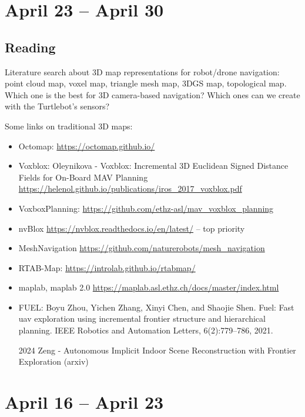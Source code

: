 \documentclass{article}
\begin{document}
\section{April 23 -- April 30}

\subsection{Reading}
Literature search about 3D map representations for robot/drone navigation: point cloud map, voxel map, triangle mesh map, 3DGS map, topological map. Which one is the best for 3D camera-based navigation? Which ones can we create with the Turtlebot's sensors?

Some links on traditional 3D maps:
\begin{itemize}
\item Octomap: \url{https://octomap.github.io/} 
\item Voxblox: Oleynikova - Voxblox: Incremental 3D Euclidean Signed Distance Fields for On-Board MAV Planning \url{https://helenol.github.io/publications/iros_2017_voxblox.pdf} 
\item VoxboxPlanning: \url{https://github.com/ethz-asl/mav_voxblox_planning} 
\item nvBlox \url{https://nvblox.readthedocs.io/en/latest/} -- top priority 
\item MeshNavigation \url{https://github.com/naturerobots/mesh_navigation} 
\item RTAB-Map: \url{https://introlab.github.io/rtabmap/} 
\item maplab, maplab 2.0 \url{https://maplab.asl.ethz.ch/docs/master/index.html} 
\item FUEL: Boyu Zhou, Yichen Zhang, Xinyi Chen, and Shaojie Shen. Fuel: Fast 
uav exploration using incremental frontier structure and hierarchical
planning. IEEE Robotics and Automation Letters, 6(2):779–786, 2021.
\item [2024] Zeng - Autonomous Implicit Indoor Scene Reconstruction with Frontier Exploration (arxiv) 
\end{itemize}
\newpage

\section{April 16 -- April 23}
\end{document}
